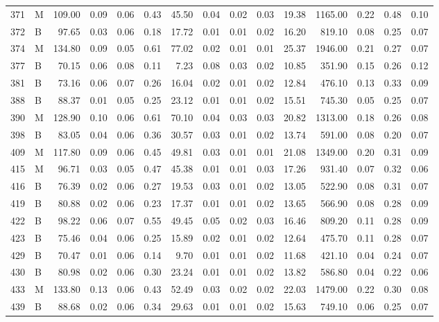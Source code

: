 \begin{table}[ht]
\begin{tabular}{rlrrrrrrrrrrrrr}
  371 & M & 109.00 & 0.09 & 0.06 & 0.43 & 45.50 & 0.04 & 0.02 & 0.03 & 19.38 & 1165.00 & 0.22 & 0.48 & 0.10 \\ 
  372 & B & 97.65 & 0.03 & 0.06 & 0.18 & 17.72 & 0.01 & 0.01 & 0.02 & 16.20 & 819.10 & 0.08 & 0.25 & 0.07 \\ 
  374 & M & 134.80 & 0.09 & 0.05 & 0.61 & 77.02 & 0.02 & 0.01 & 0.01 & 25.37 & 1946.00 & 0.21 & 0.27 & 0.07 \\ 
  377 & B & 70.15 & 0.06 & 0.08 & 0.11 & 7.23 & 0.08 & 0.03 & 0.02 & 10.85 & 351.90 & 0.15 & 0.26 & 0.12 \\ 
  381 & B & 73.16 & 0.06 & 0.07 & 0.26 & 16.04 & 0.02 & 0.01 & 0.02 & 12.84 & 476.10 & 0.13 & 0.33 & 0.09 \\ 
  388 & B & 88.37 & 0.01 & 0.05 & 0.25 & 23.12 & 0.01 & 0.01 & 0.02 & 15.51 & 745.30 & 0.05 & 0.25 & 0.07 \\ 
  390 & M & 128.90 & 0.10 & 0.06 & 0.61 & 70.10 & 0.04 & 0.03 & 0.03 & 20.82 & 1313.00 & 0.18 & 0.26 & 0.08 \\ 
  398 & B & 83.05 & 0.04 & 0.06 & 0.36 & 30.57 & 0.03 & 0.01 & 0.02 & 13.74 & 591.00 & 0.08 & 0.20 & 0.07 \\ 
  409 & M & 117.80 & 0.09 & 0.06 & 0.45 & 49.81 & 0.03 & 0.01 & 0.01 & 21.08 & 1349.00 & 0.20 & 0.31 & 0.09 \\ 
  415 & M & 96.71 & 0.03 & 0.05 & 0.47 & 45.38 & 0.01 & 0.01 & 0.03 & 17.26 & 931.40 & 0.07 & 0.32 & 0.06 \\ 
  416 & B & 76.39 & 0.02 & 0.06 & 0.27 & 19.53 & 0.03 & 0.01 & 0.02 & 13.05 & 522.90 & 0.08 & 0.31 & 0.07 \\ 
  419 & B & 80.88 & 0.02 & 0.06 & 0.23 & 17.37 & 0.01 & 0.01 & 0.02 & 13.65 & 566.90 & 0.08 & 0.28 & 0.09 \\ 
  422 & B & 98.22 & 0.06 & 0.07 & 0.55 & 49.45 & 0.05 & 0.02 & 0.03 & 16.46 & 809.20 & 0.11 & 0.28 & 0.09 \\ 
  423 & B & 75.46 & 0.04 & 0.06 & 0.25 & 15.89 & 0.02 & 0.01 & 0.02 & 12.64 & 475.70 & 0.11 & 0.28 & 0.07 \\ 
  429 & B & 70.47 & 0.01 & 0.06 & 0.14 & 9.70 & 0.01 & 0.01 & 0.02 & 11.68 & 421.10 & 0.04 & 0.24 & 0.07 \\ 
  430 & B & 80.98 & 0.02 & 0.06 & 0.30 & 23.24 & 0.01 & 0.01 & 0.02 & 13.82 & 586.80 & 0.04 & 0.22 & 0.06 \\ 
  433 & M & 133.80 & 0.13 & 0.06 & 0.43 & 52.49 & 0.03 & 0.02 & 0.02 & 22.03 & 1479.00 & 0.22 & 0.30 & 0.08 \\ 
  439 & B & 88.68 & 0.02 & 0.06 & 0.34 & 29.63 & 0.01 & 0.01 & 0.02 & 15.63 & 749.10 & 0.06 & 0.25 & 0.07 \\ 

\end{tabular}
\end{table}
